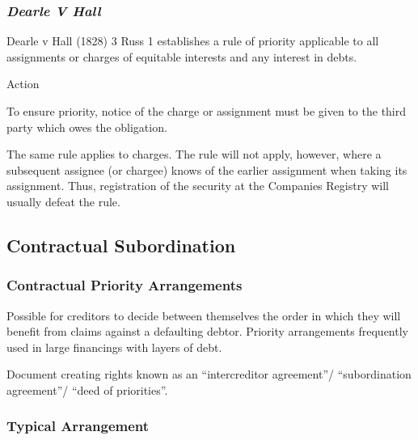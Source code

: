\documentclass[
]{article}
\newenvironment{env-0174d31b-3f44-410b-9ae6-7a7b66b1e278}
{
    \savenotes\tcolorbox[blanker,breakable,left=5pt,borderline west={2pt}{-4pt}{aquamarine}]
}
{
    \endtcolorbox\spewnotes
}
\begin{document}
\hypertarget{dearle-v-hall}{%
\subsubsection{\texorpdfstring{\emph{Dearle V
Hall}}{Dearle V Hall}}\label{dearle-v-hall}}

Dearle v Hall (1828) 3 Russ 1 establishes a rule of priority applicable
to all assignments or charges of equitable interests and any interest in
debts.

\begin{env-0174d31b-3f44-410b-9ae6-7a7b66b1e278}

Action

To ensure priority, notice of the charge or assignment must be given to
the third party which owes the obligation.

\end{env-0174d31b-3f44-410b-9ae6-7a7b66b1e278}

The same rule applies to charges. The rule will not apply, however,
where a subsequent assignee (or chargee) knows of the earlier assignment
when taking its assignment. Thus, registration of the security at the
Companies Registry will usually defeat the rule.

\hypertarget{contractual-subordination}{%
\subsection{Contractual Subordination}\label{contractual-subordination}}

\hypertarget{contractual-priority-arrangements}{%
\subsubsection{Contractual Priority
Arrangements}\label{contractual-priority-arrangements}}

Possible for creditors to decide between themselves the order in which
they will benefit from claims against a defaulting debtor. Priority
arrangements frequently used in large financings with layers of debt.

Document creating rights known as an ``intercreditor agreement''/
``subordination agreement''/ ``deed of priorities''.

\hypertarget{typical-arrangement}{%
\subsubsection{Typical Arrangement}\label{typical-arrangement}}
\end{document}
